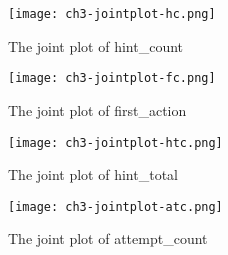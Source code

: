 \begin{figure}[htb]
    \centering
    \texttt{[image: ch3-jointplot-hc.png]}
    \caption{The joint plot of hint\_count}\label{fig:ch3-jointplot-hc}
\end{figure}

\begin{figure}[htb]
    \centering
    \texttt{[image: ch3-jointplot-fc.png]}
    \caption{The joint plot of first\_action}\label{fig:ch3-jointplot-fc}
\end{figure}

\begin{figure}[htb]
    \centering
    \texttt{[image: ch3-jointplot-htc.png]}
    \caption{The joint plot of hint\_total}\label{fig:ch3-jointplot-htc}
\end{figure}

\begin{figure}[htb]
    \centering
    \texttt{[image: ch3-jointplot-atc.png]}
    \caption{The joint plot of attempt\_count}\label{fig:ch3-jointplot-atc}
\end{figure}



